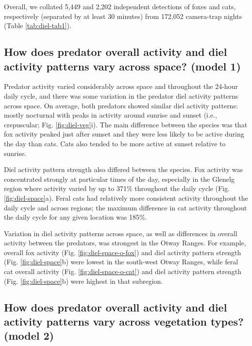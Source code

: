 \documentclass[11pt,a4paper,titlepage,twoside,openright]{style/unimelbthesis}
\begin{document}
\begin{mainmatter}
Overall, we collated 5,449 and 2,202 independent detections of foxes and cats, respectively (separated by at least 30 minutes) from 172,052 camera-trap nights (Table \ref{tab:diel-tab1}).

\hypertarget{how-does-predator-overall-activity-and-diel-activity-patterns-vary-across-space-model-1-1}{%
\subsection{How does predator overall activity and diel activity patterns vary across space? (model 1)}\label{how-does-predator-overall-activity-and-diel-activity-patterns-vary-across-space-model-1-1}}

Predator activity varied considerably across space and throughout the 24-hour daily cycle, and there was some variation in the predator diel activity patterns across space. On average, both predators showed similar diel activity patterns: mostly nocturnal with peaks in activity around sunrise and sunset (i.e., crepuscular; Fig. \ref{fig:diel-veg}i). The main difference between the species was that fox activity peaked just after sunset and they were less likely to be active during the day than cats. Cats also tended to be more active at sunset relative to sunrise.

Diel activity pattern strength also differed between the species. Fox activity was concentrated strongly at particular times of the day, especially in the Glenelg region where activity varied by up to 371\% throughout the daily cycle (Fig. \ref{fig:diel-space}a). Feral cats had relatively more consistent activity throughout the daily cycle and across regions; the maximum difference in cat activity throughout the daily cycle for any given location was 185\%.

Variation in diel activity patterns across space, as well as differences in overall activity between the predators, was strongest in the Otway Ranges. For example, overall fox activity (Fig. \ref{fig:diel-space-o-fox}) and diel activity pattern strength (Fig. \ref{fig:diel-space}b) were lowest in the south-west Otway Ranges, while feral cat overall activity (Fig. \ref{fig:diel-space-o-cat}) and diel activity pattern strength (Fig. \ref{fig:diel-space}b) were highest in that subregion.

\hypertarget{how-does-predator-overall-activity-and-diel-activity-patterns-vary-across-vegetation-types-model-2-1}{%
\subsection{How does predator overall activity and diel activity patterns vary across vegetation types? (model 2)}\label{how-does-predator-overall-activity-and-diel-activity-patterns-vary-across-vegetation-types-model-2-1}}


\end{mainmatter}
\end{document}
